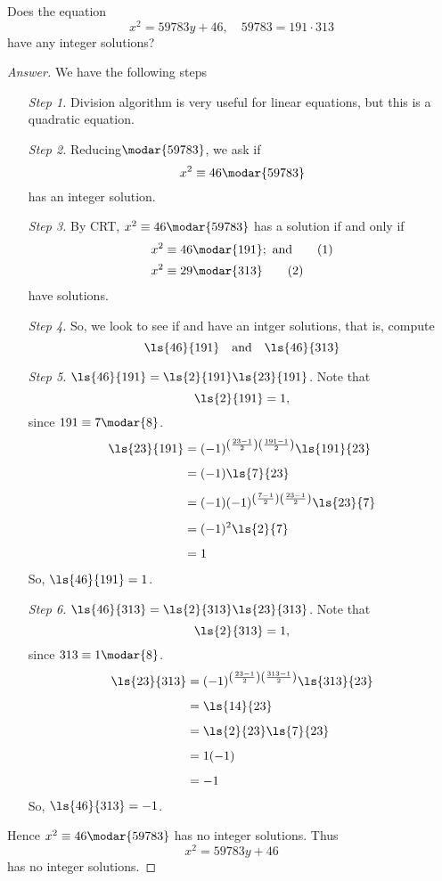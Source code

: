 \begin{example}
Does the equation
\[x^2 = 59783y + 46,\quad 59783 = 191\cdot 313\]
have any integer solutions?
\end{example}
\begin{proof}[Answer]
We have the following steps
\begin{itemize}[leftmargin=3em]
\item[\emph{Step 1.}] Division algorithm is very useful for linear equations, but this is a quadratic equation.
\item[\emph{Step 2.}] Reducing$\modar{59783}$, we ask if 
\[x^2 \equiv 46\modar{59783}\]
has an integer solution.
\item[\emph{Step 3.}] By CRT, $x^2 \equiv 46\modar{59783}$ has a solution if and only if
\begin{align*}[left=\empheqlbrace]
x^2 &\equiv 46\modar{191};\ \text{and}\label{eqc1}\tag{$1$}\\[0.1em]
x^2 &\equiv 29\modar{313}\label{eqc2}\tag{$2$}
\end{align*}
have solutions.
\item[\emph{Step 4.}] So, we look to see if  and  have an intger solutions, that is, compute
\[\ls{46}{191}\quad \text{and}\quad \ls{46}{313}\]
\item[\emph{Step 5.}] $\displaystyle \ls{46}{191} = \ls{2}{191}\ls{23}{191}$. Note that
\[\ls{2}{191} = 1,\] since $191 \equiv 7\modar{8}$.
\begin{align*}
\ls{23}{191} &= (-1)^{\left(\frac{23-1}{2}\right)\left(\frac{191-1}{2}\right)}\ls{191}{23}\\[0.5em]
&= (-1)\ls{7}{23}\\[0.5em]
&= (-1)(-1)^{\left(\frac{7-1}{2}\right)\left(\frac{23-1}{2}\right)}\ls{23}{7}\\[0.5em]
&= (-1)^2\ls{2}{7}\\[0.5em]
&= 1
\end{align*}
So, $\ls{46}{191} = 1$.
\item[\emph{Step 6.}] $\displaystyle \ls{46}{313} = \ls{2}{313}\ls{23}{313}$. Note that
\[\ls{2}{313} = 1,\] since $313 \equiv 1\modar{8}$.
\begin{align*}
\ls{23}{313} &= (-1)^{\left(\frac{23-1}{2}\right)\left(\frac{313-1}{2}\right)}\ls{313}{23}\\[0.5em]
&= \ls{14}{23}\\[0.5em]
&= \ls{2}{23}\ls{7}{23}\\[0.5em]
&= 1(-1)\\[0.5em]
&= -1
\end{align*}
So, $\ls{46}{313} = -1$.
\end{itemize}
Hence $x^2 \equiv 46 \modar{59783}$ has no integer solutions. Thus
\[x^2 = 59783y + 46\]
has no integer solutions.
\end{proof}

